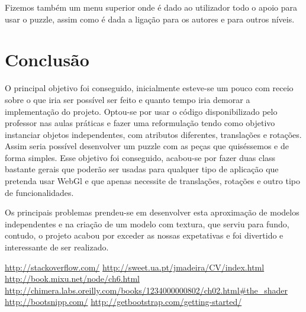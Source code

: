 \documentclass[pdftex,12pt,a4paper]{report}
\begin{document}
Fizemos também um menu superior onde é dado ao utilizador todo o apoio para usar o puzzle, assim como é dada a ligação para os autores e para outros níveis.


\section{Conclusão}

O principal objetivo foi conseguido, inicialmente esteve-se um pouco com receio sobre o que iria ser possível ser feito e quanto tempo iria demorar a implementação do projeto. Optou-se por usar o código disponibilizado pelo professor nas aulas práticas e fazer uma reformulação tendo como objetivo instanciar objetos independentes, com atributos diferentes, translações e rotações. Assim seria possível desenvolver um puzzle com as peças que quiséssemos e de forma simples. Esse objetivo foi conseguido, acabou-se por fazer duas class bastante gerais que poderão ser usadas para qualquer tipo de aplicação que pretenda usar WebGl e que apenas necessite de translações, rotações e outro tipo de funcionalidades.

Os principais problemas prendeu-se em desenvolver esta aproximação de modelos independentes e na criação de um modelo com textura, que serviu para fundo, contudo, o projeto acabou por exceder as nossas expetativas e foi divertido e interessante de ser realizado.

\renewcommand{\bibname}{Referências}

\begin{thebibliography}{} 
	 \url{http://stackoverflow.com/}
	\url{http://sweet.ua.pt/jmadeira/CV/index.html}
	 \url{http://book.mixu.net/node/ch6.html}
	 \url{http://chimera.labs.oreilly.com/books/1234000000802/ch02.html#the_shader}
	 \url{http://bootsnipp.com/}
	 \url{http://getbootstrap.com/getting-started/}
\end{thebibliography}
\end{document}
